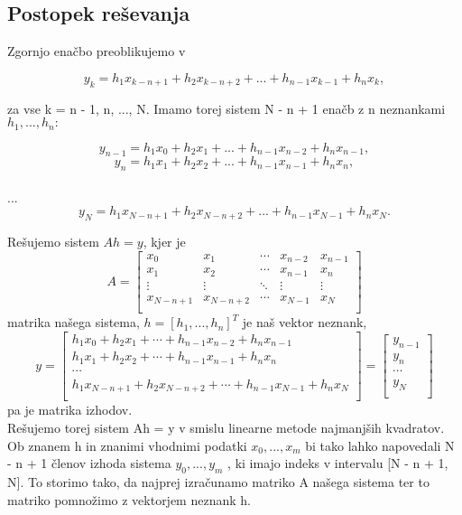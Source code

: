 \documentclass[A4]{article}
\begin{document}
\subsection {Postopek reševanja} 
Zgornjo enačbo preoblikujemo v 
{\centering
\[ 
y_{k} = h_{1} x_{k - n + 1} + h_{2} x_{k - n + 2} + ... + h_{n-1}x_{k - 1} + h_{n}x_{k}, 
\] \par
}
za vse k = n - 1, n, ..., N. Imamo torej sistem N - n + 1 enačb z n neznankami $h_{1} , ... , h_{n} :$ 
{\centering
\[ 
y_{n - 1} = h_{1} x_{0} + h_{2} x_{1} + ... + h_{n - 1}x_{n - 2} + h_{n}x_{n - 1}, 
\]
\[
y_{n} = h_{1} x_{1} + h_{2} x_{2} + ... + h_{n - 1}x_{n - 1} + h_{n}x_{n}, 
\]
\\ ...
\[ y_{N} = h_{1} x_{N - n + 1} + h_{2} x_{N - n + 2} + ... + h_{n - 1}x_{N - 1} + h_{n}x_{N}. 
\] \par }
Rešujemo sistem $Ah  = y$, kjer je 
\[
A = 
\begin{bmatrix}
x_{0} & x_{1} & \cdots  & x_{n - 2} & x_{n - 1}\\
x_{1} & x_{2} & \cdots & x_{n - 1} & x_{n}\\
\vdots  & \vdots  & \ddots & \vdots &  \vdots \\
x_{N - n + 1} & x_{N - n + 2} & \cdots & x_{N - 1} & x_{N}\\
\end{bmatrix}
\]
matrika našega sistema, $h = [h_{1}, ... , h_{n}]^T$ je naš vektor neznank, 
\[
y = 
\begin{bmatrix}
h_{1}x_{0} + h_{2}x_{1}+ \cdots  + h_{n - 1}x_{n - 2} + h_{n}x_{n - 1}\\
h_{1}x_{1} + h_{2}x_{2} + \cdots + h_{n - 1}x_{n - 1} + h_{n}x_{n}\\
\cdots \\
h_{1}x_{N - n + 1} + h_{2}x_{N - n + 2} + \cdots  + h_{n - 1}x_{N - 1} + h_{n}x_{N}\\
\end{bmatrix}
=
\begin{bmatrix}
y_{n-1}\\
y_{n}\\
\cdots \\
y_{N}\\
\end{bmatrix}
\]
pa je matrika izhodov.
\\[0.1in] Rešujemo torej sistem Ah = y v smislu linearne metode najmanjših kvadratov. Ob znanem h in znanimi vhodnimi podatki $x_{0}, ..., x_{m}$ bi tako lahko napovedali N - n + 1 členov izhoda sistema $y_{0}, ... , y_{m}$ , ki imajo indeks v intervalu [N - n + 1, N]. To storimo tako, da najprej izračunamo matriko A našega sistema ter to matriko pomnožimo z vektorjem neznank h.
\end{document}
